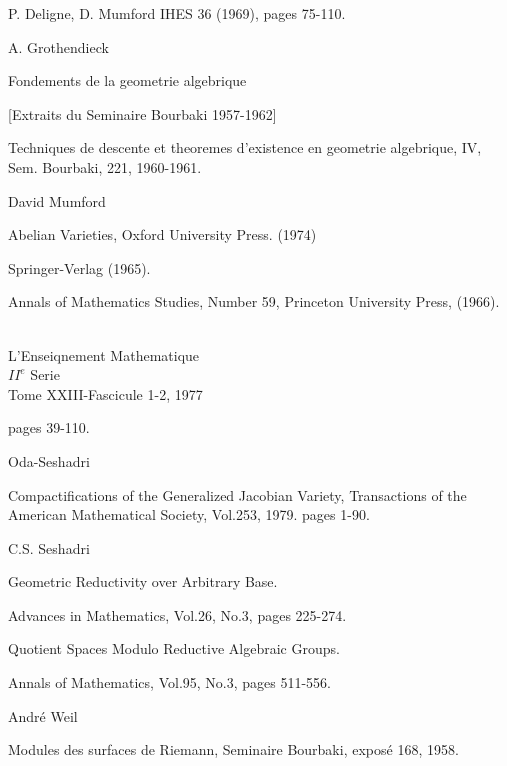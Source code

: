\begin{thebibliography}{99}
 {P. Deligne, D. Mumford} 
  IHES 36 (1969), pages 75-110.  

\medskip

{A. Grothendieck}


 {Fondements de la geometrie algebrique}

[Extraits du Seminaire Bourbaki 1957-1962]

 {Techniques de descente et theoremes d'existence en
  geometrie algebrique}, IV, Sem. Bourbaki, 221, 1960-1961. 

\medskip

{David Mumford}


 {Abelian Varieties,} Oxford University Press. (1974)

 Springer-Verlag (1965).


Annals of Mathematics Studies, Number 59, Princeton University Press, (1966).

\\
L'Enseiqnement Mathematique\\
$II^e$ Serie \\

Tome XXIII-Fascicule 1-2, 1977

pages 39-110.

\medskip
Oda-Seshadri

 {Compactifications of the Generalized Jacobian Variety,}
Transactions of the American Mathematical Society, Vol.253, 1979. pages 1-90.

\medskip

C.S. Seshadri\pageoriginale

 {Geometric Reductivity over Arbitrary Base.}

Advances in Mathematics, Vol.26, No.3, pages 225-274.

 {Quotient Spaces Modulo Reductive Algebraic Groups.}

Annals of Mathematics, Vol.95, No.3, pages 511-556.

\medskip
Andr\'e Weil

 {Modules des surfaces de Riemann}, Seminaire Bourbaki,
  expos\'e 168, 1958. 
\end{thebibliography}


